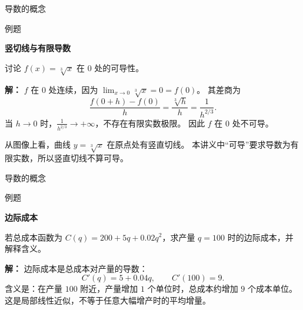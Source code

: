 \documentclass[aspectratio=169,10pt,fontset=fandol]{ctexbeamer}
\newenvironment{warning}{\par\noindent\textbf{注：}\quad}{\par\vspace{0.8em}}
\begin{document}
\begin{frame}[t,fragile]{导数的概念}
\normalsize
\begin{block}{例题}
{\normalsize
\textbf{竖切线与有限导数}\par

讨论 $f(x)=\sqrt[3]{x}$ 在 $0$ 处的可导性。

}
\end{block}
\pause
{\normalsize
\textbf{解：}
$f$ 在 $0$ 处连续，因为 $\lim_{x\to0}\sqrt[3]{x}=0=f(0)$。 其差商为
\[
\frac{f(0+h)-f(0)}{h}=\frac{\sqrt[3]{h}}{h}=\frac1{h^{2/3}}.
\]
当 $h\to0$ 时，$\frac1{h^{2/3}}\to+\infty$，不存在有限实数极限。 因此 $f$ 在 $0$ 处不可导。

从图像上看，曲线 $y=\sqrt[3]{x}$ 在原点处有竖直切线。 本讲义中“可导”要求导数为有限实数，所以竖直切线不算可导。

}
\end{frame}
\begin{frame}[t,fragile]{导数的概念}
\normalsize
\begin{block}{例题}
{\normalsize
\textbf{边际成本}\par

若总成本函数为 $C(q)=200+5q+0.02q^2$，求产量 $q=100$ 时的边际成本，并解释含义。

}
\end{block}
\pause
{\normalsize
\textbf{解：}
边际成本是总成本对产量的导数：
\[
C'(q)=5+0.04q,\qquad C'(100)=9.
\]
含义是：在产量 $100$ 附近，产量增加 $1$ 个单位时，总成本约增加 $9$ 个成本单位。 这是局部线性近似，不等于任意大幅增产时的平均增量。

}
\end{frame}
\end{document}
